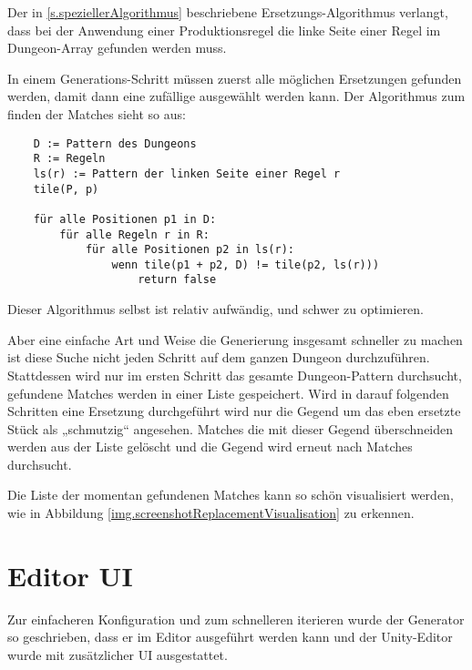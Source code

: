 Der in \ref{s.speziellerAlgorithmus} beschriebene Ersetzungs-Algorithmus verlangt, dass bei der Anwendung einer Produktionsregel die linke Seite einer Regel im Dungeon-Array gefunden werden muss.

In einem Generations-Schritt müssen zuerst alle möglichen Ersetzungen gefunden werden, damit dann eine zufällige ausgewählt werden kann. Der Algorithmus zum finden der Matches sieht so aus:

\begin{verbatim}
    D := Pattern des Dungeons
    R := Regeln
    ls(r) := Pattern der linken Seite einer Regel r
    tile(P, p)

    für alle Positionen p1 in D:
        für alle Regeln r in R:
            für alle Positionen p2 in ls(r):
                wenn tile(p1 + p2, D) != tile(p2, ls(r)))
                    return false
\end{verbatim}


Dieser Algorithmus selbst ist relativ aufwändig, und schwer zu optimieren. 

Aber eine einfache Art und Weise die Generierung insgesamt schneller zu machen ist diese Suche nicht jeden Schritt auf dem ganzen Dungeon durchzuführen. Stattdessen wird nur im ersten Schritt das gesamte Dungeon-Pattern durchsucht, gefundene Matches werden in einer Liste gespeichert. Wird in darauf folgenden Schritten eine Ersetzung durchgeführt wird nur die Gegend um das eben ersetzte Stück als „schmutzig“ angesehen. Matches die mit dieser Gegend überschneiden werden aus der Liste gelöscht und die Gegend wird erneut nach Matches durchsucht. 

Die Liste der momentan gefundenen Matches kann so schön visualisiert werden, wie in Abbildung \ref{img.screenshotReplacementVisualisation} zu erkennen.


\section{Editor UI}\label{s.editorUI}

Zur einfacheren Konfiguration und zum schnelleren iterieren wurde der Generator so geschrieben, dass er im Editor ausgeführt werden kann und der Unity-Editor wurde mit zusätzlicher UI ausgestattet.

